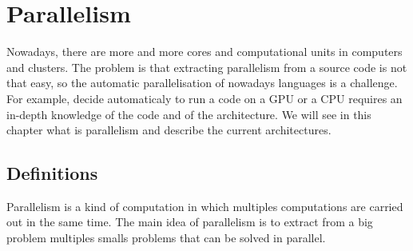 \chapter{Parallelism}\label{ch:Parallelism}
Nowadays, there are more and more cores and computational units in computers and clusters. The problem is that extracting parallelism from a source code is not that easy, so the automatic parallelisation of nowadays languages is a challenge. For example, decide automaticaly to run a code on a GPU or a CPU requires an in-depth knowledge of the code and of the architecture. We will see in this chapter what is parallelism and describe the current architectures.

\section{Definitions}
Parallelism is a kind of computation in which multiples computations are carried out in the same time. The main idea of parallelism is to extract from a big problem multiples smalls problems that can be solved in parallel. 

